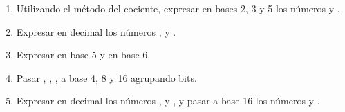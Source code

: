 \begin{enunciado}
	{\ejercicio}
	\begin{enumerate}[label=\alph{*})]
		\item Utilizando el método del cociente, expresar en bases 2, 3 y 5 los números
			 y .

		\item Expresar en decimal los números ,  y
			.

		\item Expresar  en base 5 y  en base 6.

		\item Pasar , ,
			, a base 4, 8 y 16 agrupando bits.

		\item Expresar en decimal los números , 
			y , y pasar a base 16 los números  y .
	\end{enumerate}
\end{enunciado}

